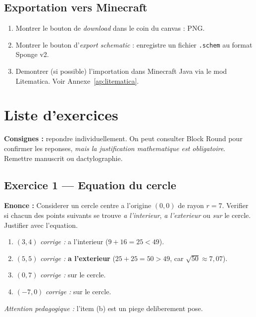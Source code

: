 \documentclass[12pt,a4paper]{scrartcl}
\newcommand{\acc}[1]{\textcolor{accent}{\textbf{#1}}}
\begin{document}
\subsection{Exportation vers Minecraft}
\begin{enumerate}[leftmargin=1.5em,itemsep=0.15em,topsep=0.3em]
  \item Montrer le bouton de \emph{download} dans le coin du canvas : PNG.
  \item Montrer le bouton d'\emph{export schematic} : enregistre un fichier \texttt{.schem} au format Sponge v2.
  \item Demontrer (si possible) l'importation dans Minecraft Java via le mod Litematica. Voir Annexe~\ref{ap:litematica}.
\end{enumerate}

\newpage
\section{Liste d'exercices}\label{ap:exerc}

\textbf{Consignes :} repondre individuellement. On peut consulter Block Round pour confirmer les reponses, \emph{mais la justification mathematique est obligatoire}. Remettre manuscrit ou dactylographie.

\subsection*{Exercice 1 --- Equation du cercle}
\textbf{Enonce :} Considerer un cercle centre a l'origine $(0, 0)$ de rayon $r = 7$. Verifier si chacun des points suivants se trouve \emph{a l'interieur}, \emph{a l'exterieur} ou \emph{sur} le cercle. Justifier avec l'equation.
\begin{enumerate}[label=\alph*),leftmargin=1.5em,itemsep=0.1em,topsep=0.2em,nosep]
  \item $(3, 4)$ \hfill \emph{corrige :} a l'interieur ($9 + 16 = 25 < 49$).
  \item $(5, 5)$ \hfill \emph{corrige :} \acc{a l'exterieur} ($25 + 25 = 50 > 49$, car $\sqrt{50} \approx 7{,}07$).
  \item $(0, 7)$ \hfill \emph{corrige :} sur le cercle.
  \item $(-7, 0)$ \hfill \emph{corrige :} sur le cercle.
\end{enumerate}

\textit{Attention pedagogique :} l'item (b) est un piege deliberement pose.
\end{document}
